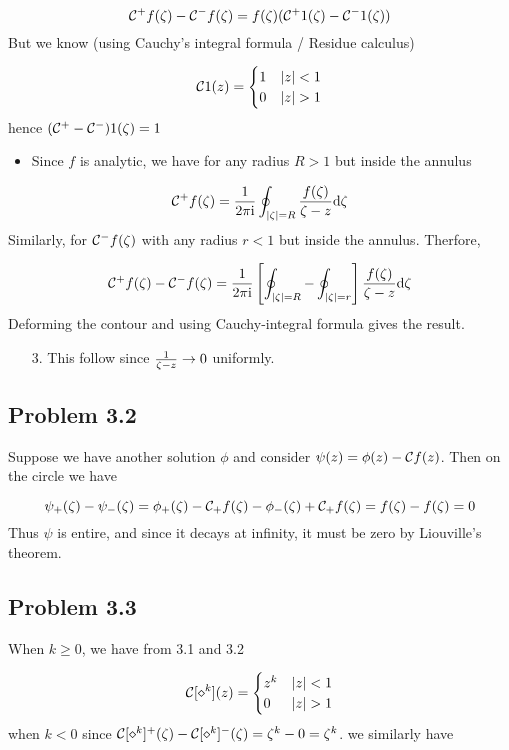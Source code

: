 \documentclass[12pt,a4paper]{article}
\def\D{ {\rm d} }
\def\I{ {\rm i} }
\def\CC{ {\cal C} }
\begin{document}
\[
\CC^+ f(\zeta) - \CC^- f(\zeta) = f(\zeta)( \CC^+ 1(\zeta) - \CC^- 1(\zeta))
\]
But we know (using Cauchy's integral formula / Residue calculus)

\[
\CC 1(z) = \begin{cases} 1 & |z| < 1 \\
                            0 & |z| > 1
                            \end{cases}
\]
hence $(\CC^+-\CC^-)1(\zeta) = 1$

\begin{itemize}
\item Since $f$ is analytic, we have for any radius $R > 1$ but inside the annulus

\end{itemize}
\[
\CC^+ f(\zeta) = {1 \over 2 \pi \I} \oint_{|\zeta| = R} {f(\zeta) \over \zeta -z} \D\zeta
\]
Similarly, for $\CC^-f(\zeta)$ with any radius $r < 1$ but inside the annulus. Therfore,

\[
\CC^+ f(\zeta) - \CC^- f(\zeta) = {1 \over 2 \pi \I} \left[\oint_{|\zeta| = R} - \oint_{|\zeta| = r} \right] {f(\zeta) \over \zeta -z} \D\zeta
\]
Deforming the contour and using Cauchy-integral formula gives the result.

\begin{itemize}
\item[3. ] This follow since ${1 \over \zeta - z} \rightarrow 0$ uniformly.

\end{itemize}
\subsection{Problem 3.2}
Suppose we have another solution $\phi$ and consider $\psi(z) = \phi(z) - \CC f(z)$. Then on the circle we have

\[
\psi_+(\zeta) - \psi_-(\zeta) = \phi_+(\zeta) - \CC_+f(\zeta) - \phi_-(\zeta) + \CC_+f(\zeta) = f(\zeta)-f(\zeta) = 0
\]
Thus $\psi$ is entire, and since it decays at infinity, it must be zero by Liouville's theorem.

\subsection{Problem 3.3}
When $k \geq 0$, we have from 3.1 and 3.2

\[
\CC[\diamond^k](z) =\begin{cases}
    z^k  & |z| < 1 \\
    0 & |z| > 1
    \end{cases}
\]
when $k < 0$ since $\CC[\diamond^k]^+(\zeta) - \CC[\diamond^k]^-(\zeta) = \zeta^k - 0 = \zeta^k$. we similarly have
\end{document}
